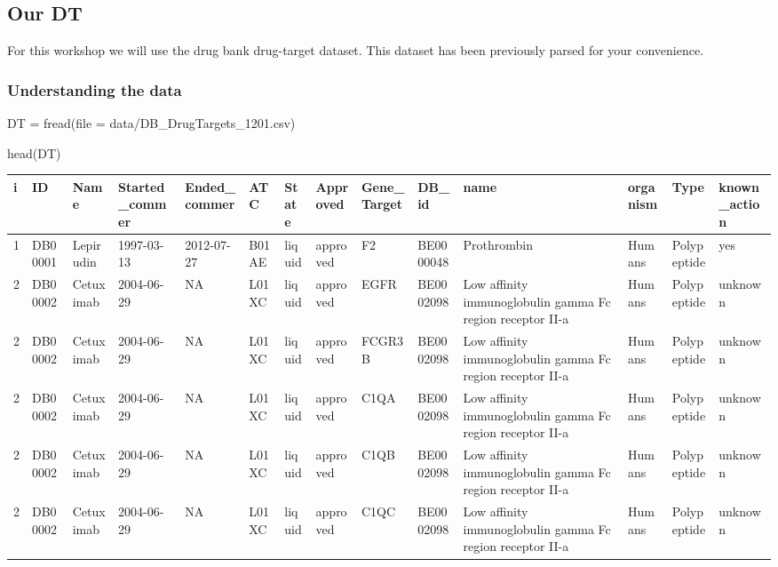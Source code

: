 \documentclass[
]{book}
\newenvironment{Shaded}{\begin{snugshade}}{\end{snugshade}}
\newcommand{\AttributeTok}[1]{\textcolor[rgb]{0.77,0.63,0.00}{#1}}
\newcommand{\FunctionTok}[1]{\textcolor[rgb]{0.00,0.00,0.00}{#1}}
\newcommand{\NormalTok}[1]{#1}
\newcommand{\OtherTok}[1]{\textcolor[rgb]{0.56,0.35,0.01}{#1}}
\newcommand{\StringTok}[1]{\textcolor[rgb]{0.31,0.60,0.02}{#1}}
\begin{document}
\hypertarget{our-dt}{%
\subsection{Our DT}\label{our-dt}}

For this workshop we will use the drug bank drug-target dataset. This dataset has been previously parsed for your convenience.

\hypertarget{understanding-the-data-2}{%
\subsubsection{Understanding the data}\label{understanding-the-data-2}}

\begin{Shaded}
\begin{Highlighting}[]
\NormalTok{DT }\OtherTok{=} \FunctionTok{fread}\NormalTok{(}\AttributeTok{file =} \StringTok{\textquotesingle{}data/DB\_DrugTargets\_1201.csv\textquotesingle{}}\NormalTok{)}

\FunctionTok{head}\NormalTok{(DT)}
\end{Highlighting}
\end{Shaded}

\begin{tabular}{l|l|l|l|l|l|l|l|l|l|l|l|l|l}
\hline
i & ID & Name & Started\_commer & Ended\_commer & ATC & State & Approved & Gene\_Target & DB\_id & name & organism & Type & known\_action\\
\hline
1 & DB00001 & Lepirudin & 1997-03-13 & 2012-07-27 & B01AE & liquid & approved & F2 & BE0000048 & Prothrombin & Humans & Polypeptide & yes\\
\hline
2 & DB00002 & Cetuximab & 2004-06-29 & NA & L01XC & liquid & approved & EGFR & BE0002098 & Low affinity immunoglobulin gamma Fc region receptor II-a & Humans & Polypeptide & unknown\\
\hline
2 & DB00002 & Cetuximab & 2004-06-29 & NA & L01XC & liquid & approved & FCGR3B & BE0002098 & Low affinity immunoglobulin gamma Fc region receptor II-a & Humans & Polypeptide & unknown\\
\hline
2 & DB00002 & Cetuximab & 2004-06-29 & NA & L01XC & liquid & approved & C1QA & BE0002098 & Low affinity immunoglobulin gamma Fc region receptor II-a & Humans & Polypeptide & unknown\\
\hline
2 & DB00002 & Cetuximab & 2004-06-29 & NA & L01XC & liquid & approved & C1QB & BE0002098 & Low affinity immunoglobulin gamma Fc region receptor II-a & Humans & Polypeptide & unknown\\
\hline
2 & DB00002 & Cetuximab & 2004-06-29 & NA & L01XC & liquid & approved & C1QC & BE0002098 & Low affinity immunoglobulin gamma Fc region receptor II-a & Humans & Polypeptide & unknown\\
\hline
\end{tabular}
\end{document}
